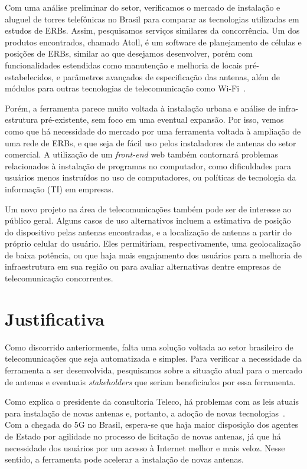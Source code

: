 \documentclass[]{politex}
\begin{document}
Com uma análise preliminar do setor, verificamos o mercado de instalação e
aluguel de torres telefônicas no Brasil para comparar as tecnologias utilizadas
em estudos de ERBs. Assim, pesquisamos serviços similares da concorrência. Um
dos produtos encontrados, chamado Atoll, é um software de planejamento de
células e posições de ERBs, similar ao que desejamos desenvolver, porém com
funcionalidades estendidas como manutenção e melhoria de locais
pré-estabelecidos, e parâmetros avançados de especificação das antenas, além de
módulos para outras tecnologias de telecomunicação como Wi-Fi~\cite{atoll}.

Porém, a ferramenta parece muito voltada à instalação urbana e análise de
infra-estrutura pré-existente, sem foco em uma eventual expansão. Por isso,
vemos como que há necessidade do mercado por uma ferramenta voltada à ampliação
de uma rede de ERBs, e que seja de fácil uso pelos instaladores de antenas do
setor comercial. A utilização de um \textit{front-end} web também contornará
problemas relacionados à instalação de programas no computador, como
dificuldades para usuários menos instruídos no uso de computadores, ou políticas
de tecnologia da informação (TI) em empresas.

Um novo projeto na área de telecomunicações também pode ser de interesse ao
público geral. Alguns casos de uso alternativos incluem a estimativa de posição
do dispositivo pelas antenas encontradas, e a localização de antenas a partir
do próprio celular do usuário. Eles permitiriam, respectivamente, uma
geolocalização de baixa potência, ou que haja mais engajamento dos usuários para
a melhoria de infraestrutura em sua região ou para avaliar alternativas dentre
empresas de telecomunicação concorrentes.

\section{Justificativa}
Como discorrido anteriormente, falta uma solução voltada ao setor brasileiro de
telecomunicações que seja automatizada e simples. Para verificar a necessidade
da ferramenta a ser desenvolvida, pesquisamos sobre a situação atual para o
mercado de antenas e eventuais \textit{stakeholders} que seriam beneficiados
por essa ferramenta.

Como explica o presidente da consultoria Teleco, há problemas com as leis atuais
para instalação de novas antenas e, portanto, a adoção de novas
tecnologias~\cite{tude}. Com a chegada do 5G no Brasil, espera-se que haja maior
disposição dos agentes de Estado por agilidade no processo de licitação de novas
antenas, já que há necessidade dos usuários por um acesso à Internet melhor e
mais veloz. Nesse sentido, a ferramenta pode acelerar a instalação de novas
antenas.
\end{document}
